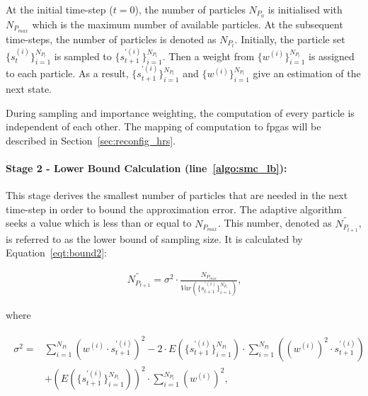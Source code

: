 At the initial time-step ($t=0$), the number of particles ${N_{P_0}}$ is initialised with ${N_{P_{max}}}$ which is the maximum number of available particles.
At the subsequent time-steps, the number of particles is denoted as ${N_{P_t}}$.
Initially, the particle set $\{s_{t}^{(i)}\}^{N_{P_t}}_{i=1}$ is sampled to $\{s_{t+1}^{\prime(i)}\}^{N_{P_t}}_{i=1}$.
Then a weight from $\{w^{(i)}\}^{N_{P_t}}_{i=1}$ is assigned to each particle. 
As a result, $\{s_{t+1}^{\prime(i)}\}^{N_{P_t}}_{i=1}$ and $\{w^{(i)}\}^{N_{P_t}}_{i=1}$ give an estimation of the next state.

During sampling and importance weighting, the computation of every particle is independent of each other. 
The mapping of computation to \glspl{fpga} will be described in Section~\ref{sec:reconfig_hrs}.

\paragraph{Stage 2 - Lower Bound Calculation (line~\ref{algo:smc_lb}): }

This stage derives the smallest number of particles that are needed in the next time-step in order to bound the approximation error.
The adaptive algorithm seeks a value which is less than or equal to ${N_{P_{max}}}$.
This number, denoted as $\widetilde{N_{P_{t+1}}}$, is referred to as the lower bound of sampling size.
It is calculated by Equation~\ref{eqt:bound2}:

\begin{equation}
\begin{aligned}
\widetilde{N_{P_{t+1}}} = \sigma^2 \cdot \frac{{N_{P_{max}}}}{Var(\{s_{t+1}^{\prime(i)}\}^{N_{P_t}}_{i=1})} \mbox{,}
\end{aligned}
\label{eqt:bound2}
\end{equation}

where

\begin{eqnarray}
\begin{aligned}
\sigma^2 = & \sum_{i=1}^{{N_{P_t}}}\left({w}^{(i)} \cdot s_{t+1}^{\prime(i)} \right)^2 - 2 \cdot E(\{s_{t+1}^{\prime(i)}\}^{N_{P_t}}_{i=1}) \cdot \sum_{i=1}^{N_{P_t}} \left ( ({w}^{(i)})^2 \cdot s_{t+1}^{\prime(i)} \right ) \\
& + \left(E(\{s_{t+1}^{\prime(i)}\}^{N_{P_t}}_{i=1})\right)^2 \cdot \sum_{i=1}^{N_{P_t}}({w}^{(i)})^2 \mbox{,}
\end{aligned}
\label{eqt:bound3}
\end{eqnarray}

